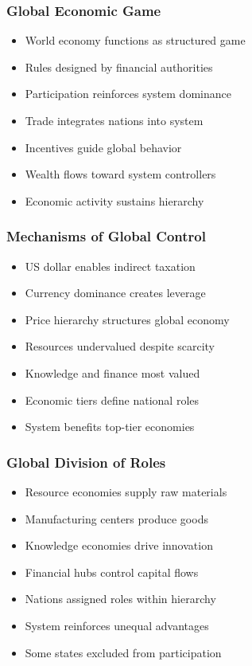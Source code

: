 \begin{frame}[fragile]\frametitle{Global Economic Game}
\begin{itemize}
\item World economy functions as structured game
\item Rules designed by financial authorities
\item Participation reinforces system dominance
\item Trade integrates nations into system
\item Incentives guide global behavior
\item Wealth flows toward system controllers
\item Economic activity sustains hierarchy
\end{itemize}
\end{frame}

\begin{frame}[fragile]\frametitle{Mechanisms of Global Control}
\begin{itemize}
\item US dollar enables indirect taxation
\item Currency dominance creates leverage
\item Price hierarchy structures global economy
\item Resources undervalued despite scarcity
\item Knowledge and finance most valued
\item Economic tiers define national roles
\item System benefits top-tier economies
\end{itemize}
\end{frame}

\begin{frame}[fragile]\frametitle{Global Division of Roles}
\begin{itemize}
\item Resource economies supply raw materials
\item Manufacturing centers produce goods
\item Knowledge economies drive innovation
\item Financial hubs control capital flows
\item Nations assigned roles within hierarchy
\item System reinforces unequal advantages
\item Some states excluded from participation
\end{itemize}
\end{frame}

